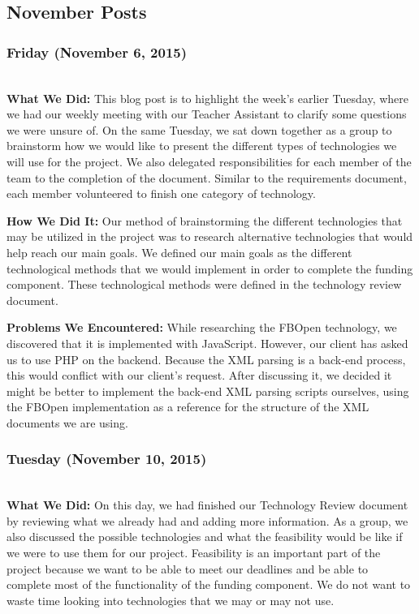 \documentclass[onecolumn]{IEEEtran}
\begin{document}
\subsection{November Posts}
\subsubsection{Friday (November 6, 2015)} \hspace*{\fill} \\  
    \textbf{What We Did: }
    This blog post is to highlight the week's earlier Tuesday, where we had our weekly meeting with our Teacher Assistant to clarify some questions we were unsure of. On the same Tuesday, we sat down together as a group to brainstorm how we would like to present the different types of technologies we will use for the project. We also delegated responsibilities for each member of the team to the completion of the document. Similar to the requirements document, each member volunteered to finish one category of technology.  
    
    \textbf{How We Did It: } 
    Our method of brainstorming the different technologies that may be utilized in the project was to research alternative technologies that would help reach our main goals. We defined our main goals as the different technological methods that we would implement in order to complete the funding component. These technological methods were defined in the technology review document.  
    
    \textbf{Problems We Encountered: } 
    While researching the FBOpen technology, we discovered that it is implemented with JavaScript. However, our client has asked us to use PHP on the backend. Because the XML parsing is a back-end process, this would conflict with our client's request. After discussing it, we decided it might be better to implement the back-end XML parsing scripts ourselves, using the FBOpen implementation as a reference for the structure of the XML documents we are using.  

\subsubsection{Tuesday (November 10, 2015)} \hspace*{\fill} \\  
    \textbf{What We Did: }
    On this day, we had finished our Technology Review document by reviewing what we already had and adding more information. As a group, we also discussed the possible technologies and what the feasibility would be like if we were to use them for our project. Feasibility is an important part of the project because we want to be able to meet our deadlines and be able to complete most of the functionality of the funding component. We do not want to waste time looking into technologies that we may or may not use.  
    
\end{document}
